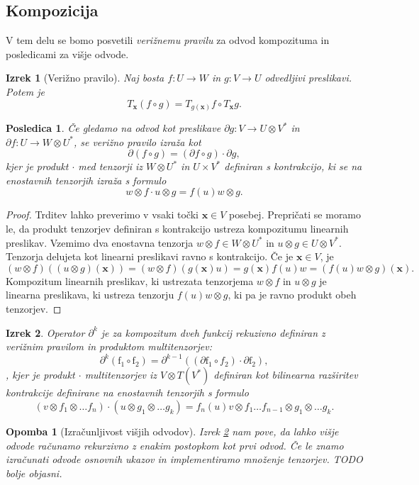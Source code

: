 \documentclass{article}
\newcommand{\x}{\mathbf{x}}
\newcommand{\D}{\partial}
\newtheorem{izrek}{Izrek}[section]
\newtheorem{opomba}{Opomba}[section]
\newtheorem{posledica}{Posledica}[section]
\begin{document}
\subsection{Kompozicija}
V tem delu se bomo posvetili \emph{verižnemu pravilu} za odvod kompozituma in
posledicami za višje odvode.
\begin{izrek}[Verižno pravilo]
  Naj bosta $f:U\to W$ in $g:V\to U$ odvedljivi preslikavi. Potem je 
\[T_\x(f\circ g)=T_{g(\x)}f\circ T_\x g.\]
\end{izrek}
\begin{posledica}
Če gledamo na odvod kot preslikave $\D g:V\to U \otimes V^*$ in $\D f:U\to
W\otimes U^*$, se \emph{verižno pravilo} izraža kot
\[\D(f\circ g) = (\D f\circ g)\cdot \D g,\]
kjer je produkt $\cdot$ med tenzorji iz $W\otimes U^*$ in $U\times V^*$
definiran s kontrakcijo, ki se na enostavnih tenzorjih izraža s formulo
$$w\otimes f\cdot u\otimes g=f(u)w\otimes g.$$
\end{posledica}
\begin{proof}
Trditev lahko preverimo v vsaki točki $\x\in V$ posebej. Prepričati se moramo
le, da produkt tenzorjev definiran s kontrakcijo ustreza kompozitumu linearnih
preslikav. Vzemimo dva enostavna tenzorja $w\otimes f\in W\otimes U^*$ in
$u\otimes g\in U\otimes V^*$. Tenzorja delujeta kot linearni preslikavi ravno s
kontrakcijo. Če je $\x\in V$, je 
\[(w\otimes f)((u\otimes g)(\x))=(w\otimes f)(g(\x)u) = g(\x)f(u)w = (f(u)w
  \otimes g)(\x).\]
 Kompozitum linearnih preslikav, ki ustrezata tenzorjema $w\otimes f$ in
 $u\otimes g$ je linearna preslikava, ki ustreza tenzorju $f(u)w\otimes g$, ki
 pa je ravno produkt obeh tenzorjev.
\end{proof}
 \begin{izrek}\label{izr:D^nRek}
 	Operator $\D^k$ je za kompozitum dveh funkcij rekuzivno definiran z verižnim pravilom in produktom multitenzorjev:
 	$$\D^k(\mathrm{f_1}\circ \mathrm{f_2})=\D^{k-1}((\D \mathrm{f_1}\circ
  f_2)\cdot \D \mathrm{f_2}),$$,
kjer je produkt $\cdot$ multitenzorjev iz $V\otimes T(V^*)$ definiran kot
bilinearna razširitev kontrakcije definirane na enostavnih tenzorjih s formulo
$$(v\otimes f_1\otimes\ldots f_n)\cdot (u\otimes g_1\otimes \ldots
 g_k) = f_n(u)v\otimes f_1\ldots f_{n-1}\otimes g_1\otimes \ldots
 g_k. $$
 \end{izrek}
 \begin{opomba}[Izračunljivost višjih odvodov]
   Izrek \ref{izr:D^nRek} nam pove, da lahko višje odvode računamo rekurzivno z
   enakim postopkom kot prvi odvod. Če le znamo izračunati odvode osnovnih
   ukazov in implementiramo množenje tenzorjev. TODO bolje objasni.
 \end{opomba}
\end{document}
